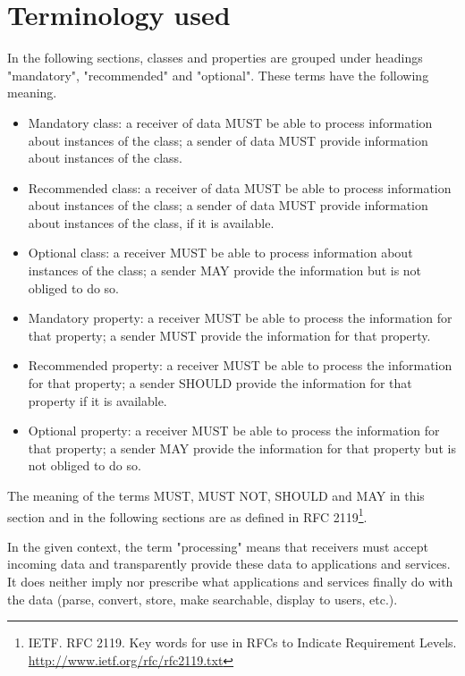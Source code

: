 \section{Terminology used}
\label{ariaid-title12}

In the following sections, classes and properties are grouped under
headings "mandatory", "recommended" and "optional". These terms have the
following meaning.

\begin{itemize}
\item
  Mandatory class: a receiver of data MUST be able to process
  information about instances of the class; a sender of data MUST
  provide information about instances of the class.
\item
  Recommended class: a receiver of data MUST be able to process
  information about instances of the class; a sender of data MUST
  provide information about instances of the class, if it is available.
\item
  Optional class: a receiver MUST be able to process information about
  instances of the class; a sender MAY provide the information but is
  not obliged to do so.
\item
  Mandatory property: a receiver MUST be able to process the information
  for that property; a sender MUST provide the information for that
  property.
\item
  Recommended property: a receiver MUST be able to process the
  information for that property; a sender SHOULD provide the information
  for that property if it is available.
\item
  Optional property: a receiver MUST be able to process the information
  for that property; a sender MAY provide the information for that
  property but is not obliged to do so.
\end{itemize}

The meaning of the terms MUST, MUST NOT, SHOULD and MAY in this section
and in the following sections are as defined in RFC
2119\footnote{IETF. RFC 2119. Key
	words for use in RFCs to Indicate Requirement Levels.
	\url{http://www.ietf.org/rfc/rfc2119.txt}}.

In the given context, the term "processing" means that receivers must
accept incoming data and transparently provide these data to
applications and services. It does neither imply nor prescribe what
applications and services finally do with the data (parse, convert,
store, make searchable, display to users, etc.).

